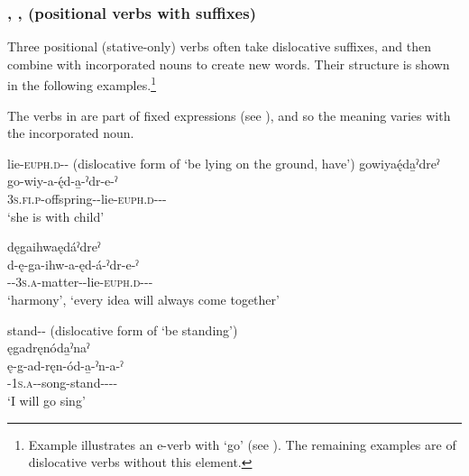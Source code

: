 \subsubsection{, ,  (positional verbs with {\dislocative} suffixes)} \label{[+ędaˀdr-], [+odaˀn-], [+ǫdaˀn-]}
Three positional (stative-only) verbs often take dislocative suffixes, and then combine with incorporated nouns to create new words. Their structure is shown in the following examples.\footnote{Example  illustrates an e-verb with  ‘go’ (see ). The remaining examples are of dislocative verbs without this element.}

The verbs in  are part of fixed expressions (see ), and so the meaning varies with the incorporated noun.

\ea\label{ex:disposex}  lie-\textsc{euph.d}-{\joinerA}-\exsc{\dislocative} (dislocative form of  ‘be lying on the ground, have’)
\ea gowiyaę́da̱ˀdreˀ\\
\gll go-wiy-a-ę́d-a̱-ˀdr-e-ˀ\\
 \textsc{3s.fi.p}-offspring-{\joinerA}-lie-\textsc{euph.d}-{\joinerA}-{\dislocative}-\\
\glt `she is with child'


\ex dęgaihwaędáˀdreˀ \\
\gll d-ę-ga-ihw-a-ęd-á-ˀdr-e-ˀ\\
 {\dualic}-{\future}-\textsc{3s.a}-matter-{\joinerA}-lie-\textsc{euph.d}-{\joinerA}-{\dislocative}-\\
\glt ‘harmony’, `every idea will always come together'

\z
\z

\ea\label{ex:disposex2}  stand-{\joinerA}-\exsc{\dislocative} (dislocative form of  ‘be standing’)\\
ęgadręnóda̱ˀnaˀ\\
\gll ę-g-ad-ręn-ód-a̱-ˀn-a-ˀ\\
 \fut-\textsc{1s.a}-{\semireflexive}-song-stand-{\joinerA}-{\dislocative}-{\joinerA}-{\punctual}\\
\glt `I will go sing'

